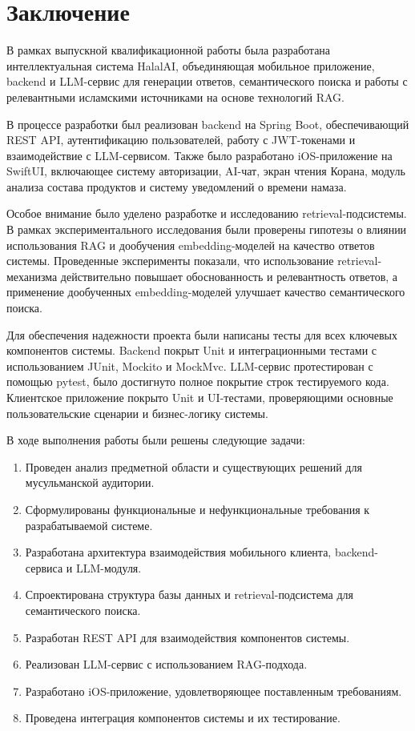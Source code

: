 \chapter*{Заключение}
\label{ch:conclusion}


В рамках выпускной квалификационной работы была разработана интеллектуальная система HalalAI, объединяющая мобильное приложение, backend и LLM-сервис для генерации ответов, семантического поиска и работы с релевантными исламскими источниками на основе технологий RAG.


В процессе разработки был реализован backend на Spring Boot, обеспечивающий REST API, аутентификацию пользователей, работу с JWT-токенами и взаимодействие с LLM-сервисом. Также было разработано iOS-приложение на SwiftUI, включающее систему авторизации, AI-чат, экран чтения Корана, модуль анализа состава продуктов и систему уведомлений о времени намаза.


Особое внимание было уделено разработке и исследованию retrieval-подсистемы. В рамках экспериментального исследования были проверены гипотезы о влиянии использования RAG и дообучения embedding-моделей на качество ответов системы. Проведенные эксперименты показали, что использование retrieval-механизма действительно повышает обоснованность и релевантность ответов, а применение дообученных embedding-моделей улучшает качество семантического поиска.


Для обеспечения надежности проекта были написаны тесты для всех ключевых компонентов системы. Backend покрыт Unit и интеграционными тестами с использованием JUnit, Mockito и MockMvc. LLM-сервис протестирован с помощью pytest, было достигнуто полное покрытие строк тестируемого кода. Клиентское приложение покрыто Unit и UI-тестами, проверяющими основные пользовательские сценарии и бизнес-логику системы.


В ходе выполнения работы были решены следующие задачи:

\begin{enumerate}
	\item Проведен анализ предметной области и существующих решений для мусульманской аудитории.
	\item Сформулированы функциональные и нефункциональные требования к разрабатываемой системе.
	\item Разработана архитектура взаимодействия мобильного клиента, backend-сервиса и LLM-модуля.
	\item Спроектирована структура базы данных и retrieval-подсистема для семантического поиска.
	\item Разработан REST API для взаимодействия компонентов системы.
	\item Реализован LLM-сервис с использованием RAG-подхода.
	\item Разработано iOS-приложение, удовлетворяющее поставленным требованиям.
	\item Проведена интеграция компонентов системы и их тестирование.
\end{enumerate}

